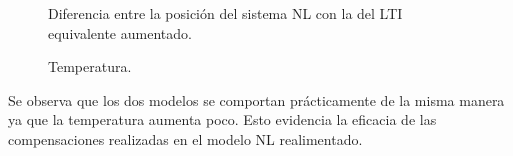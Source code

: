 \documentclass[a4paper, 10pt, onecolumn,journal]{ieeeconf}
\begin{document}
\begin{figure}[H]
	\centering
	\begin{adjustbox}{max width=\columnwidth}
	\end{adjustbox}
	\caption{Diferencia entre la posición del sistema NL con la del LTI equivalente aumentado.}
	\label{Diferencia entre la posición del sistema NL con la del LTI equivalente aumentado}
\end{figure}
\begin{figure}[H]
	\centering
	\begin{adjustbox}{max width=\columnwidth}
	\end{adjustbox}
	\caption{Temperatura.}
	\label{Temperatura}
\end{figure}
Se observa que los dos modelos se comportan prácticamente de la misma manera ya que la temperatura aumenta poco. Esto evidencia la eficacia de las compensaciones realizadas en el modelo NL realimentado.
\end{document}
